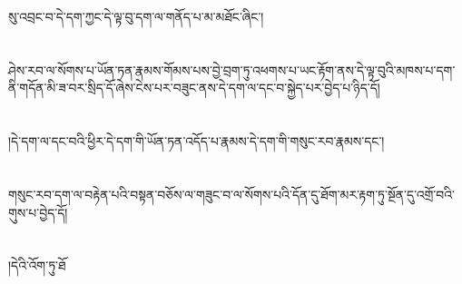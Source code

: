སུ་འབྲང་བ་དེ་དག་ཀྱང་དེ་ལྟ་བུ་དག་ལ་གནོད་པ་མ་མཐོང་ཞིང་།\chapter{ }ཤེས་རབ་ལ་སོགས་པ་ཡོན་ཏན་རྣམས་གོམས་པས་བྱེ་བྲག་ཏུ་འཕགས་པ་ཡང་རྟོག་ནས་དེ་ལྟ་བུའི་མཁས་པ་དག་ནི་གདོན་མི་ཟ་བར་སྲིད་དོ་ཞེས་ངེས་པར་བཟུང་ནས་དེ་དག་ལ་དང་བ་སྐྱེད་པར་བྱེད་པ་ཉིད་དོ།\chapter{ }།དེ་དག་ལ་དང་བའི་ཕྱིར་དེ་དག་གི་ཡོན་ཏན་འདོད་པ་རྣམས་དེ་དག་གི་གསུང་རབ་རྣམས་དང་།\chapter{ }གསུང་རབ་དག་ལ་བརྟེན་པའི་བསྟན་བཅོས་ལ་གཟུང་བ་ལ་སོགས་པའི་དོན་དུ་ཐོག་མར་རྟག་ཏུ་སྔོན་དུ་འགྲོ་བའི་གུས་པ་བྱེད་དོ།\chapter{ }།དེའི་འོག་ཏུ་ཐོ